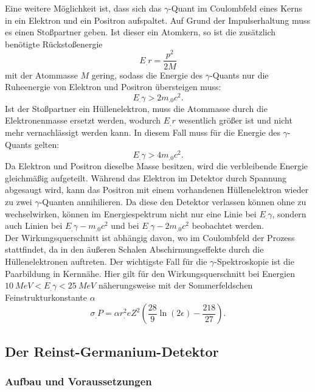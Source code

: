 Eine weitere Möglichkeit ist, dass sich das $\gamma$-Quant im Coulombfeld eines Kerns in ein Elektron und ein Positron aufspaltet. Auf Grund der Impulserhaltung muss es einen Stoßpartner geben. Ist dieser ein Atomkern, so ist die zusätzlich benötigte Rückstoßenergie 
\[
E_.r=\frac{p^2}{2M}
\]
mit der Atommasse $M$ gering, sodass die Energie des $\gamma$-Quants nur die Ruheenergie von Elektron und Positron übersteigen muss:
\[
E_.{\gamma}>2m_.0c^2\text{.}
\]
Ist der Stoßpartner ein Hüllenelektron, muss die Atommasse durch die Elektronenmasse ersetzt werden, wodurch $E_.r$ wesentlich größer ist und nicht mehr vernachlässigt werden kann.
In diesem Fall muss für die Energie des $\gamma$-Quants gelten:
\[
E_.{\gamma}>4m_.0c^2\text{.}
\]
Da Elektron und Positron dieselbe Masse besitzen, wird die verbleibende Energie gleichmäßig aufgeteilt.
Während das Elektron im Detektor durch Spannung abgesaugt wird, kann das Positron mit einem vorhandenen Hüllenelektron wieder zu zwei $\gamma$-Quanten annihilieren.
Da diese den Detektor verlassen können ohne zu wechselwirken, können im Energiespektrum nicht nur eine Linie bei $E_.{\gamma}$, sondern auch Linien bei $E_.{\gamma}-m_.0c^2$ und bei $E_.{\gamma}-2m_.0c^2$ beobachtet werden.\\
Der Wirkungsquerschnitt ist abhängig davon, wo im Coulombfeld der Prozess stattfindet, da in den äußeren Schalen Abschirmungseffekte durch die Hüllenelektronen auftreten.
Der wichtigste Fall für die $\gamma$-Spektroskopie ist die Paarbildung in Kernnähe.
Hier gilt für den Wirkungsquerschnitt bei Energien $\SI{10}{MeV}<E_.{\gamma}<\SI{25}{MeV}$ näherungsweise mit der Sommerfeldschen Feinstrukturkonstante $\alpha$
\begin{equation}
\sigma_.P=\alpha r^2_.eZ^2\left(\frac{28}{9}\ln(2\epsilon)-\frac{218}{27}\right)\text{.}\label{eq:s_P}
\end{equation}

\subsection{Der Reinst-Germanium-Detektor}

\subsubsection{Aufbau und Voraussetzungen}

